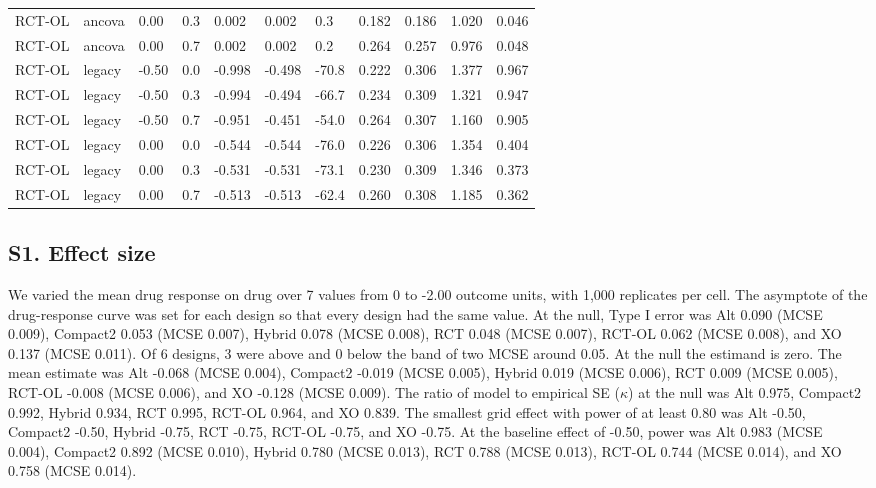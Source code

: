 \documentclass[
  11pt,
]{article}
\begin{document}
\begin{table}
{\begin{tabular}[t]{lllrlllllll}
RCT-OL & ancova & 0.00 & 0.3 & 0.002 & 0.002 & 0.3 & 0.182 & 0.186 & 1.020 & 0.046\\
RCT-OL & ancova & 0.00 & 0.7 & 0.002 & 0.002 & 0.2 & 0.264 & 0.257 & 0.976 & 0.048\\
RCT-OL & legacy & -0.50 & 0.0 & -0.998 & -0.498 & -70.8 & 0.222 & 0.306 & 1.377 & 0.967\\
RCT-OL & legacy & -0.50 & 0.3 & -0.994 & -0.494 & -66.7 & 0.234 & 0.309 & 1.321 & 0.947\\
\addlinespace
RCT-OL & legacy & -0.50 & 0.7 & -0.951 & -0.451 & -54.0 & 0.264 & 0.307 & 1.160 & 0.905\\
RCT-OL & legacy & 0.00 & 0.0 & -0.544 & -0.544 & -76.0 & 0.226 & 0.306 & 1.354 & 0.404\\
RCT-OL & legacy & 0.00 & 0.3 & -0.531 & -0.531 & -73.1 & 0.230 & 0.309 & 1.346 & 0.373\\
RCT-OL & legacy & 0.00 & 0.7 & -0.513 & -0.513 & -62.4 & 0.260 & 0.308 & 1.185 & 0.362\\
\bottomrule
\end{tabular}}
\end{table}

\subsection{S1. Effect size}\label{s1.-effect-size}

We varied the mean drug response on drug over 7 values from 0 to -2.00 outcome units, with 1,000 replicates per cell. The asymptote of the drug-response curve was set for each design so that every design had the same value. At the null, Type I error was Alt 0.090 (MCSE 0.009), Compact2 0.053 (MCSE 0.007), Hybrid 0.078 (MCSE 0.008), RCT 0.048 (MCSE 0.007), RCT-OL 0.062 (MCSE 0.008), and XO 0.137 (MCSE 0.011). Of 6 designs, 3 were above and 0 below the band of two MCSE around 0.05. At the null the estimand is zero. The mean estimate was Alt -0.068 (MCSE 0.004), Compact2 -0.019 (MCSE 0.005), Hybrid 0.019 (MCSE 0.006), RCT 0.009 (MCSE 0.005), RCT-OL -0.008 (MCSE 0.006), and XO -0.128 (MCSE 0.009). The ratio of model to empirical SE (\(\kappa\)) at the null was Alt 0.975, Compact2 0.992, Hybrid 0.934, RCT 0.995, RCT-OL 0.964, and XO 0.839. The smallest grid effect with power of at least 0.80 was Alt -0.50, Compact2 -0.50, Hybrid -0.75, RCT -0.75, RCT-OL -0.75, and XO -0.75. At the baseline effect of -0.50, power was Alt 0.983 (MCSE 0.004), Compact2 0.892 (MCSE 0.010), Hybrid 0.780 (MCSE 0.013), RCT 0.788 (MCSE 0.013), RCT-OL 0.744 (MCSE 0.014), and XO 0.758 (MCSE 0.014).
\end{document}
